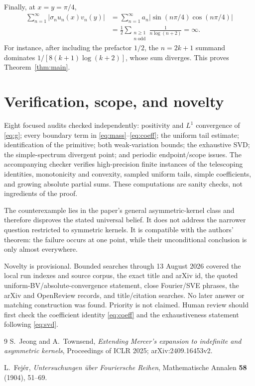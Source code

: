 \documentclass[11pt]{article}
\theoremstyle{remark}
\begin{document}
Finally, at $x=y=\pi/4$,
\begin{align*}
 \sum_{n=1}^{\infty}|\sigma_nu_n(x)v_n(y)|
 &=\sum_{n=1}^{\infty}a_n
   |\sin(n\pi/4)\cos(n\pi/4)|\\
 &=\frac12\sum_{\substack{n\geq1\\ n\ \mathrm{odd}}}
   \frac1{n\log(n+2)}=\infty.                                    \label{eq:diverge}
\end{align*}
For instance, after including the prefactor $1/2$, the $n=2k+1$ summand
dominates $1/[8(k+1)\log(k+2)]$, whose sum diverges.  This proves
Theorem~\ref{thm:main}.

\section{Verification, scope, and novelty}

Eight focused audits checked independently: positivity and $L^1$ convergence
of \eqref{eq:g}; every boundary term in \eqref{eq:mass}--\eqref{eq:coeff}; the
uniform tail estimate; identification of the primitive; both weak-variation
bounds; the exhaustive SVD; the simple-spectrum divergent point; and periodic
endpoint/scope issues.  The accompanying checker verifies high-precision
finite instances of the telescoping identities, monotonicity and convexity,
sampled uniform tails, simple coefficients, and growing absolute partial
sums.  These computations are sanity checks, not ingredients of the proof.

The counterexample lies in the paper's general asymmetric-kernel class and
therefore disproves the stated universal belief.  It does not address the
narrower question restricted to symmetric kernels.  It is compatible with
the authors' theorem: the failure occurs at one point, while their
unconditional conclusion is only almost everywhere.

Novelty is provisional.  Bounded searches through 13 August 2026 covered the
local run indexes and source corpus, the exact title and arXiv id, the quoted
uniform-BV/absolute-convergence statement, close Fourier/SVE phrases, the
arXiv and OpenReview records, and title/citation searches.  No later answer or
matching construction was found.  Priority is not claimed.  Human review
should first check the coefficient identity \eqref{eq:coeff} and the
exhaustiveness statement following \eqref{eq:svd}.

\begin{thebibliography}{9}
S.~Jeong and A.~Townsend,
\emph{Extending Mercer's expansion to indefinite and asymmetric kernels},
Proceedings of ICLR 2025; arXiv:2409.16453v2.

L.~Fej\'er,
\emph{Untersuchungen \"uber Fouriersche Reihen},
Mathematische Annalen \textbf{58} (1904), 51--69.
\end{thebibliography}
\end{document}
